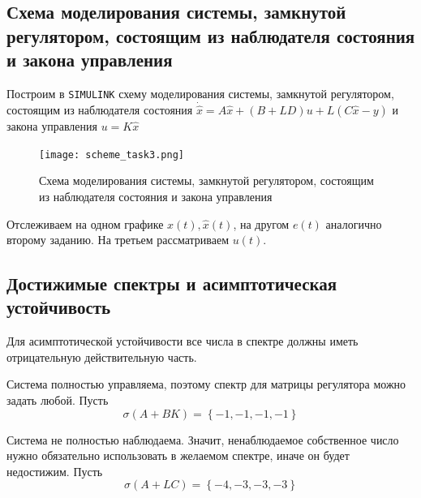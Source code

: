 \documentclass[a4paper, 12pt]{article}
\begin{document}
    \subsection{Схема моделирования системы, замкнутой регулятором, состоящим из наблюдателя состояния и закона управления}
    Построим в \texttt{SIMULINK} схему моделирования системы, замкнутой регулятором, состоящим из наблюдателя состояния
    $\dot{\hat{x}}=A\hat{x}+\left(B+LD\right)u+L\left(C\hat{x}-y\right)$ и закона управления $u=K\hat{x}$
    \begin{figure}[H]
        \centering
        \texttt{[image: scheme\_task3.png]}
        \captionsetup{skip=0pt}
        \caption{Схема моделирования системы, замкнутой регулятором, состоящим из наблюдателя состояния и закона управления}
        \label{fig:scheme_task3}
    \end{figure}
    \noindent Отслеживаем на одном графике $x(t),\hat{x}(t)$, на другом $e(t)$ аналогично второму заданию.
    На третьем рассматриваем $u(t)$.


    \subsection{Достижимые спектры и асимптотическая устойчивость}
    Для асимптотической устойчивости все числа в спектре должны иметь отрицательную действительную часть.
    
    
    Система полностью управляема, поэтому спектр для матрицы регулятора можно задать любой. Пусть
    $$
    \sigma\left(A+BK\right)=\left\{-1,-1,-1,-1\right\}
    $$


    Система не полностью наблюдаема.
    Значит, ненаблюдаемое собственное число нужно обязательно использовать в желаемом спектре,
    иначе он будет недостижим. Пусть
    $$
\sigma\left(A+LC\right)=\left\{-4,-3,-3,-3\right\}
    $$
\end{document}

